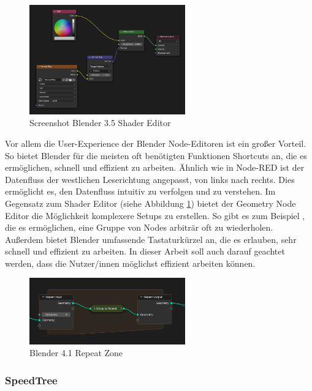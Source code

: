 \documentclass[ngerman]{article}
\begin{document}
\begin{figure}[htbp]
  \centering
  \includegraphics[width=0.6\textwidth]{./graphics/blender-shader.png}
  \caption{Screenshot Blender 3.5 Shader Editor}
  \label{fig:blender-shader}
\end{figure}

Vor allem die User-Experience der Blender Node-Editoren ist ein großer Vorteil. So bietet Blender für die meisten oft benötigten Funktionen Shortcuts an, die es ermöglichen, schnell und effizient zu arbeiten.
Ähnlich wie in Node-RED ist der Datenfluss der westlichen Leserichtung angepasst, von links nach rechts. Dies ermöglicht es, den Datenfluss intuitiv zu verfolgen und zu verstehen.
\br
Im Gegensatz zum Shader Editor (siehe Abbildung \ref{fig:blender-shader}) bietet der Geometry Node Editor die Möglichkeit komplexere Setups zu erstellen. So gibt es zum Beispiel , die es ermöglichen, eine Gruppe von Nodes arbiträr oft zu wiederholen.
\br
Außerdem bietet Blender umfassende Tastaturkürzel an, die es erlauben, sehr schnell und effizient zu arbeiten. In dieser Arbeit soll auch darauf geachtet werden, dass die Nutzer/innen möglichst effizient arbeiten können.

\begin{figure}[htbp]
  \centering
  \includegraphics[width=0.6\textwidth]{./graphics/modeling_geometry-nodes_repeat_zone.png}
  \caption{Blender 4.1 Repeat Zone \cite{blenderRepeatZone}}
  \label{fig:blender-repeat}
\end{figure}

\pagebreak

\subsubsection{SpeedTree}
\end{document}
